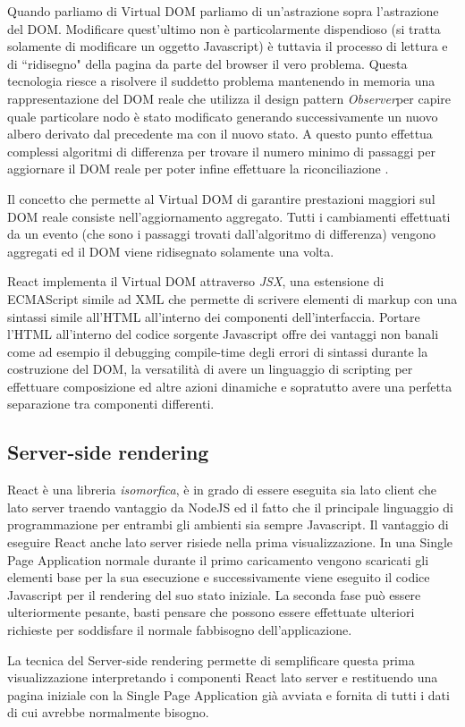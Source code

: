 Quando parliamo di Virtual DOM parliamo di un'astrazione sopra l'astrazione del DOM. Modificare quest'ultimo non è particolarmente dispendioso (si tratta solamente di modificare un oggetto Javascript) è tuttavia il processo di lettura e di “ridisegno" della pagina da parte del browser il vero problema. Questa tecnologia riesce a risolvere il suddetto problema mantenendo in memoria una rappresentazione del DOM reale che utilizza il design pattern \textit{Observer}\footnotemark per capire quale particolare nodo è stato modificato generando successivamente un nuovo albero derivato dal precedente ma con il nuovo stato. A questo punto effettua complessi algoritmi di differenza per trovare il numero minimo di passaggi per aggiornare il DOM reale per poter infine effettuare la riconciliazione \cite{MishraOnVirtualDOM}.

Il concetto che permette al Virtual DOM di garantire prestazioni maggiori sul DOM reale consiste nell'aggiornamento aggregato. Tutti i cambiamenti effettuati da un evento (che sono i passaggi trovati dall'algoritmo di differenza) vengono aggregati ed il DOM viene ridisegnato solamente una volta.

React implementa il Virtual DOM attraverso \textit{JSX}, una estensione di ECMAScript simile ad XML che permette di scrivere elementi di markup con una sintassi simile all'HTML all'interno dei componenti dell'interfaccia. Portare l'HTML all'interno del codice sorgente Javascript offre dei vantaggi non banali come ad esempio il debugging compile-time degli errori di sintassi durante la costruzione del DOM, la versatilità di avere un linguaggio di scripting per effettuare composizione ed altre azioni dinamiche e sopratutto avere una perfetta separazione tra componenti differenti.


\subsection{Server-side rendering}
React è una libreria \textit{isomorfica}, è in grado di essere eseguita sia lato client che lato server traendo vantaggio da NodeJS ed il fatto che il principale linguaggio di programmazione per entrambi gli ambienti sia sempre Javascript.
Il vantaggio di eseguire React anche lato server risiede nella prima visualizzazione. In una Single Page Application normale durante il primo caricamento vengono scaricati gli elementi base per la sua esecuzione e successivamente viene eseguito il codice Javascript per il rendering del suo stato iniziale. La seconda fase può essere ulteriormente pesante, basti pensare che possono essere effettuate ulteriori richieste per soddisfare il normale fabbisogno dell'applicazione.

La tecnica del Server-side rendering permette di semplificare questa prima visualizzazione interpretando i componenti React lato server e restituendo una pagina iniziale con la Single Page Application già avviata e fornita di tutti i dati di cui avrebbe normalmente bisogno.